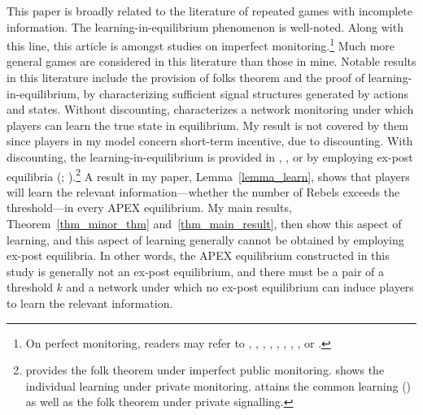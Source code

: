 \documentclass[12pt,letter]{article}
\theoremstyle{definition}
\theoremstyle{definition}
\theoremstyle{remark}
\theoremstyle{claim}
\begin{document}
This paper is broadly related to the literature of repeated games with incomplete information. The learning-in-equilibrium phenomenon is well-noted. Along with this line, this article is amongst studies on imperfect monitoring.\footnote{On perfect monitoring, readers may refer to \citep{FORGES1992155}, \citep{Hart1985}, \citep{Aumann1995}, \citep{Jordan1995}, \citep{Cripps2003}, \citep{GOSSNER2003}, \citep{Horner2009}, \citep{Horner2011}, or \citep{Wiseman2012}.}
Much more general games are considered in this literature than those in mine. Notable results in this literature include the provision of folks theorem and the proof of learning-in-equilibrium, by characterizing sufficient signal structures generated by actions and states. Without discounting, \citep{RENAULT2004124} characterizes a network monitoring under which players can learn the true state in equilibrium. My result is not covered by them since players in my model concern short-term incentive, due to discounting. With discounting, the learning-in-equilibrium is provided in \citep{Fudenberg2011}, \citep{Yamamoto2014}, or \citep{Sugaya2018} by employing ex-post equilibria (\citep{Horner2009}; \citep{Horner2011}).\footnote{\citep{Fudenberg2011} provides the folk theorem under imperfect public monitoring. \citep{Yamamoto2014} shows the individual learning under private monitoring. \citep{Sugaya2018} attains the common learning (\citep{Cripps2008}) as well as the folk theorem under private signalling.}
A result in my paper, Lemma~\ref{lemma_learn}, shows that players will learn the relevant information---whether the number of Rebels exceeds the threshold---in every APEX equilibrium. My main results, Theorem~\ref{thm_minor_thm} and~\ref{thm_main_result}, then show this aspect of learning, and this aspect of learning generally cannot be obtained by employing ex-post equilibria. In other words, the APEX equilibrium constructed in this study is generally not an ex-post equilibrium, and there must be a pair of a threshold $k$ and a network under which no ex-post equilibrium can induce players to learn the relevant information.



 
\end{document}
